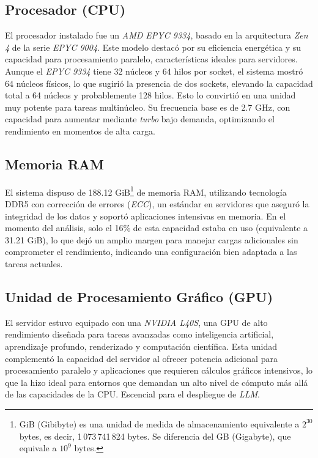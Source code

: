 \subsection*{Procesador (CPU)}
El procesador instalado fue un \textit{AMD EPYC 9334}, basado en la arquitectura \textit{Zen 4} de la serie \textit{EPYC 9004}. Este modelo destacó por su eficiencia energética y su capacidad para procesamiento paralelo, características ideales para servidores. Aunque el \textit{EPYC 9334} tiene 32 núcleos y 64 hilos por socket, el sistema mostró 64 núcleos físicos, lo que sugirió la presencia de dos sockets, elevando la capacidad total a 64 núcleos y probablemente 128 hilos. Esto lo convirtió en una unidad muy potente para tareas multinúcleo. Su frecuencia base es de 2.7 GHz, con capacidad para aumentar mediante \textit{turbo} bajo demanda, optimizando el rendimiento en momentos de alta carga.

\subsection*{Memoria RAM}
El sistema dispuso de 188.12 GiB\footnote{GiB (Gibibyte) es una unidad de medida de almacenamiento equivalente a $2^{30}$ bytes, es decir, 1\,073\,741\,824 bytes. Se diferencia del GB (Gigabyte), que equivale a $10^9$ bytes.} de memoria RAM, utilizando tecnología DDR5 con corrección de errores (\textit{ECC}), un estándar en servidores que aseguró la integridad de los datos y soportó aplicaciones intensivas en memoria. En el momento del análisis, solo el 16\% de esta capacidad estaba en uso (equivalente a 31.21 GiB), lo que dejó un amplio margen para manejar cargas adicionales sin comprometer el rendimiento, indicando una configuración bien adaptada a las tareas actuales.

\subsection*{Unidad de Procesamiento Gráfico (GPU)}
El servidor estuvo equipado con una \textit{NVIDIA L40S}, una GPU de alto rendimiento diseñada para tareas avanzadas como inteligencia artificial, aprendizaje profundo, renderizado y computación científica. Esta unidad complementó la capacidad del servidor al ofrecer potencia adicional para procesamiento paralelo y aplicaciones que requieren cálculos gráficos intensivos, lo que la hizo ideal para entornos que demandan un alto nivel de cómputo más allá de las capacidades de la CPU. Escencial para el despliegue de \textit{LLM}.

